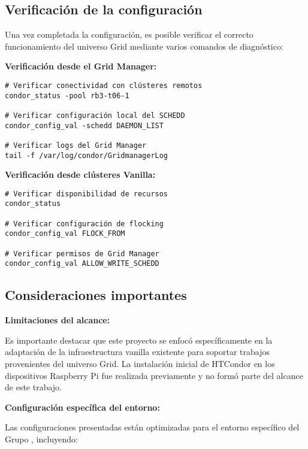 \FloatBarrier\subsection{Verificación de la configuración}

Una vez completada la configuración, es posible verificar el correcto funcionamiento del universo Grid mediante varios comandos de diagnóstico:

\textbf{Verificación desde el Grid Manager:}

\begin{verbatim}
# Verificar conectividad con clústeres remotos
condor_status -pool rb3-t06-1

# Verificar configuración local del SCHEDD
condor_config_val -schedd DAEMON_LIST

# Verificar logs del Grid Manager
tail -f /var/log/condor/GridmanagerLog
\end{verbatim}

\textbf{Verificación desde clústeres Vanilla:}

\begin{verbatim}
# Verificar disponibilidad de recursos
condor_status

# Verificar configuración de flocking
condor_config_val FLOCK_FROM

# Verificar permisos de Grid Manager
condor_config_val ALLOW_WRITE_SCHEDD
\end{verbatim}

\FloatBarrier\subsection{Consideraciones importantes}

\textbf{Limitaciones del alcance:}

Es importante destacar que este proyecto se enfocó específicamente en la adaptación de la infraestructura vanilla existente para soportar trabajos provenientes del universo Grid. La instalación inicial de HTCondor en los dispositivos Raspberry Pi fue realizada previamente y no formó parte del alcance de este trabajo.

\textbf{Configuración específica del entorno:}

Las configuraciones presentadas están optimizadas para el entorno específico del Grupo \GRID, incluyendo:

